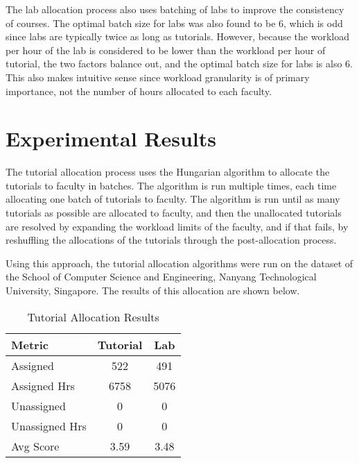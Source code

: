 The lab allocation process also uses batching of labs to improve the consistency of courses. The optimal batch size for labs was also found to be 6, which is odd since labs are typically twice as long as tutorials. However, because the workload per hour of the lab is considered to be lower than the workload per hour of tutorial, the two factors balance out, and the optimal batch size for labs is also 6. This also makes intuitive sense since workload granularity is of primary importance, not the number of hours allocated to each faculty.


\section{Experimental Results}

The tutorial allocation process uses the Hungarian algorithm to allocate the tutorials to faculty in batches. The algorithm is run multiple times, each time allocating one batch of tutorials to faculty. The algorithm is run until as many tutorials as possible are allocated to faculty, and then the unallocated tutorials are resolved by expanding the workload limits of the faculty, and if that fails, by reshuffling the allocations of the tutorials through the post-allocation process.

Using this approach, the tutorial allocation algorithms were run on the dataset of the School of Computer Science and Engineering, Nanyang Technological University, Singapore. The results of this allocation are shown below.

\begin{table}[ht]
  \centering
  \begin{tabular}{|l|c|c|}
    \hline
    \textbf{Metric} & \textbf{Tutorial} & \textbf{Lab} \\ \hline
    Assigned        & 522               & 491          \\
    Assigned Hrs    & 6758              & 5076         \\ \hline
    Unassigned      & 0                 & 0            \\
    Unassigned Hrs  & 0                 & 0            \\ \hline
    Avg Score       & 3.59              & 3.48         \\
    \hline
  \end{tabular}
  \caption{Tutorial Allocation Results}
  \label{tab:tut_lab_allocation_results}
\end{table}

